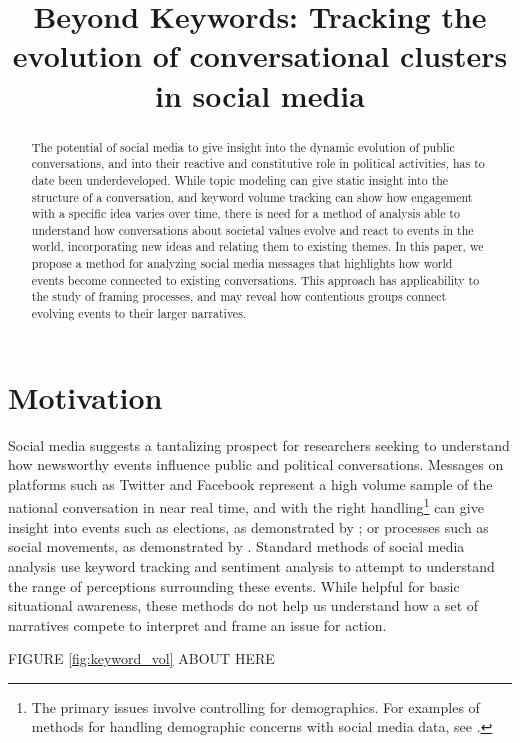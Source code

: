 \documentclass[12pt]{article}
\title{Beyond Keywords: Tracking the evolution of conversational clusters in social media}
\begin{document}
\maketitle

\begin{abstract}
   The potential of social media to give insight into the dynamic evolution of public conversations, and into their reactive and constitutive role in political activities, has to date been underdeveloped. While topic modeling can give static insight into the structure of a conversation, and keyword volume tracking can show how engagement with a specific idea varies over time, there is need for a method of analysis able to understand how conversations about societal values evolve and react to events in the world, incorporating new ideas and relating them to existing themes. In this paper, we propose a method for analyzing social media messages that highlights how world events become connected to existing conversations. This approach has applicability to the study of framing processes, and may reveal how contentious groups connect evolving events to their larger narratives.
\end{abstract}

\doublespacing

\section{Motivation}
	Social media suggests a tantalizing prospect for researchers seeking to understand how newsworthy events influence public and political conversations. Messages on platforms such as Twitter and Facebook represent a high volume sample  of the national conversation in near real time, and with the right handling\footnote{The primary issues involve controlling for demographics. For examples of methods for handling demographic concerns with social media data, see \cite{Bail2015b,McCormick2015}.} can give insight into events such as elections, as demonstrated by \cite{Huberty2013,Tumasjan2010}; or processes such as social movements, as demonstrated by \cite{Agarwal2014,DiGrazia2015}. 
Standard methods of social media analysis use keyword tracking and sentiment analysis to attempt to understand the range of perceptions surrounding these events. 
While helpful for basic situational awareness, these methods do not help us understand how a set of narratives compete to interpret and frame an issue for action.

\begin{center}
FIGURE \ref{fig:keyword_vol} ABOUT HERE
\end{center}
\end{document}
